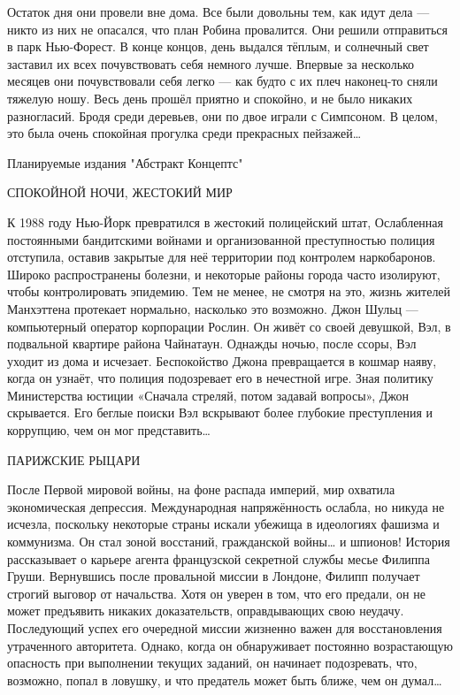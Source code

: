 \documentclass[a4paper,12pt]{book}
\begin{document}
	Остаток дня они провели вне дома. Все были довольны тем, как идут дела — никто из них не опасался, что план Робина провалится.
	 Они решили отправиться в парк Нью-Форест. В конце концов, день выдался тёплым, и солнечный свет заставил их всех почувствовать себя немного лучше.
	Впервые за несколько месяцев они почувствовали себя легко — как будто с их плеч наконец-то сняли тяжелую ношу. Весь день прошёл приятно и спокойно, и не было никаких разногласий.
	Бродя среди деревьев, они по двое играли с Симпсоном.
	В целом, это была очень спокойная прогулка среди прекрасных пейзажей…

\newpage
Планируемые издания "Абстракт Концептс"



СПОКОЙНОЙ НОЧИ, ЖЕСТОКИЙ МИР

К 1988 году Нью-Йорк превратился в жестокий полицейский штат, Ослабленная постоянными бандитскими войнами и организованной преступностью полиция отступила, оставив закрытые для неё территории под контролем наркобаронов. Широко распространены болезни, и некоторые районы города часто изолируют, чтобы контролировать эпидемию. Тем не менее, не смотря на это, жизнь жителей Манхэттена протекает нормально, насколько это возможно.
Джон Шульц — компьютерный оператор корпорации Рослин. Он живёт со своей девушкой, Вэл, в подвальной квартире района Чайнатаун.
Однажды ночью, после ссоры, Вэл уходит из дома и исчезает. Беспокойство Джона превращается в кошмар наяву, когда он узнаёт, что полиция подозревает его в нечестной игре. Зная политику Министерства юстиции «Сначала стреляй, потом задавай вопросы», Джон скрывается.
Его беглые поиски Вэл вскрывают более глубокие преступления и коррупцию, чем он мог представить…


ПАРИЖСКИЕ РЫЦАРИ

После Первой мировой войны, на фоне распада империй, мир охватила экономическая депрессия. Международная напряжённость ослабла, но никуда не исчезла, поскольку некоторые страны искали убежища в идеологиях фашизма и коммунизма.
Он стал зоной восстаний, гражданской войны… и шпионов!
История рассказывает о карьере агента французской секретной службы месье Филиппа Груши. Вернувшись после провальной миссии в Лондоне, Филипп получает строгий выговор от начальства. Хотя он уверен в том, что его предали, он не может предъявить никаких доказательств, оправдывающих свою неудачу. Последующий успех его очередной миссии жизненно важен для восстановления утраченного авторитета. Однако, когда он обнаруживает постоянно возрастающую опасность при выполнении текущих заданий, он начинает подозревать, что, возможно, попал в ловушку, и что предатель может быть ближе, чем он думал…
\end{document}
